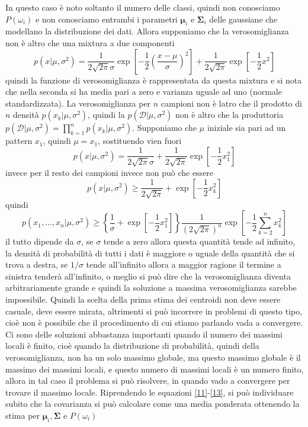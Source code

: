 In questo caso è noto soltanto il numero delle classi, quindi non conosciamo $P(\omega_i)$ e non conosciamo entrambi i parametri $\mathbf{\mu}_i$ e $\mathbf{\Sigma}_i$ delle gaussiane che modellano la distribuzione dei dati. Allora supponiamo che la verosomiglianza non è altro che una mixtura a due componenti
\begin{equation}
p(x|\mu, \sigma^2) =\frac{1}{2 \sqrt{2\pi} \sigma} \exp \left[ -\frac{1}{2} \left( \frac{x -\mu}{\sigma} \right)^2  \right]  + \frac{1}{2 \sqrt{2\pi}} \exp \left[ -\frac{1}{2}x^2 \right]
\end{equation}
quindi la funzione di verosomiglianza è rappresentata da questa mixtura e si nota che nella seconda si ha media pari a zero e varianza uguale ad uno (normale standardizzata). La verosomiglianza per $n$ campioni non è latro che il prodotto di $n$ densità $p(x_k|\mu, \sigma^2)$, quindi la $p(\mathcal{D}|\mu, \sigma^2)$ non è altro che la produttoria $p(\mathcal{D}|\mu, \sigma^2) = \prod_{k=1}^n p(x_k|\mu, \sigma^2)$. Supponiamo che $\mu$ iniziale sia pari ad un pattern $x_1$, quindi $\mu=x_1$, sostituendo vien fuori
\begin{equation}
p(x|\mu, \sigma^2) =\frac{1}{2 \sqrt{2\pi} \sigma} + \frac{1}{2 \sqrt{2\pi}} \exp \left[ -\frac{1}{2}x_1^2 \right]
\end{equation}
invece per il resto dei campioni invece non può che essere
\begin{equation}
p(x|\mu, \sigma^2) \geq \frac{1}{2 \sqrt{2\pi}} +  \exp \left[ -\frac{1}{2}x_k^2 \right]
\end{equation}
quindi
\begin{equation}
p(x_1, \dots, x_n | \mu, \sigma^2) \geq \left\{ \frac{1}{\sigma} + \exp \left[ -\frac{1}{2}x_1^2    \right] \right\} \frac{1}{(2\sqrt{2\pi})^n} \exp \left[ -\frac{1}{2} \sum_{k=2}^n x_k^2 \right]
\end{equation}
il tutto dipende da $\sigma$, se $\sigma$ tende a zero allora questa quantità tende ad infinito, la densità di probabilità di tutti i dati è maggiore o uguale della quantità che si trova a destra, se $1/\sigma$ tende all'infinito allora a maggior ragione il termine a sinistra tenderà all'infinito, o meglio si può dire che la verosomiglianza diventa arbitrariamente grande e quindi la soluzione a massima verosomiglianza sarebbe impossibile. Quindi la scelta della prima stima dei centroidi non deve essere casuale, deve essere mirata, altrimenti si può incorrere in problemi di questo tipo, cioè non è possibile che il procedimento di cui stiamo parlando vada a convergere. Ci sono delle soluzioni abbastanza importanti quando il numero dei massimi locali è finito, cioè quando la distribuzione di probabilità, quindi della verosomiglianza, non ha un solo massimo globale, ma questo massimo globale è il massimo dei massimi locali, e questo numero di massimi locali è un numero finito, allora in tal caso il problema si può risolvere, in quando vado a convergere per trovare il massimo locale. Riprendendo le equazioni \ref{11}-\ref{13}, si può individuare subito che la covarianza si può calcolare come una media ponderata ottenendo la stima per $\mathbf{\mu}_i, \mathbf{\Sigma}$ e $P(\omega_i)$    


